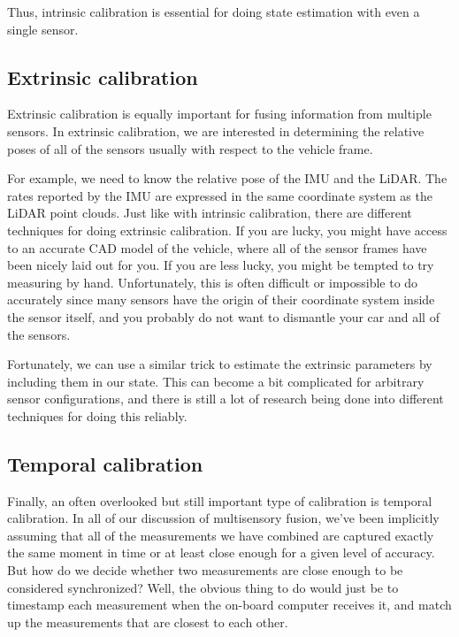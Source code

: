 Thus, intrinsic calibration is essential for doing state estimation with
even a single sensor. 

\subsection{Extrinsic calibration}
\label{extrinsic_calibration}

Extrinsic calibration is equally important for fusing information
from multiple sensors. In extrinsic calibration, we are interested in determining the relative
poses of all of the sensors usually with respect to
the vehicle frame. 

For example, we need to know the relative pose of
the IMU and the LiDAR. The rates reported by the IMU are expressed in the same coordinate system as the LiDAR point clouds. Just like with
intrinsic calibration, there are different
techniques for doing extrinsic
calibration. If you are lucky, you
might have access to an accurate CAD model of the vehicle, where all of
the sensor frames have been nicely
laid out for you. If you are less
lucky, you might be tempted to try
measuring by hand. Unfortunately, this is often difficult or
impossible to do accurately since
many sensors have the origin of
their coordinate system inside the sensor itself, and you probably do not
want to dismantle your car and all
of the sensors. 

Fortunately, we can use a similar trick
to estimate the extrinsic
parameters by including them
in our state. This can become a
bit complicated for arbitrary sensor
configurations, and there is still a lot of research
being done into different techniques for doing this reliably. 


\subsection{Temporal calibration}

Finally, an often overlooked but still important type of calibration is
temporal calibration. In all of
our discussion of multisensory fusion, we've been
implicitly assuming that all of the
measurements we have combined are captured exactly the same moment in time or at least close enough for a given
level of accuracy. But how do we decide whether
two measurements are close enough to be considered synchronized? Well, the obvious
thing to do would just be to timestamp each measurement
when the on-board computer receives it, and match up the
measurements that are closest
to each other. 

